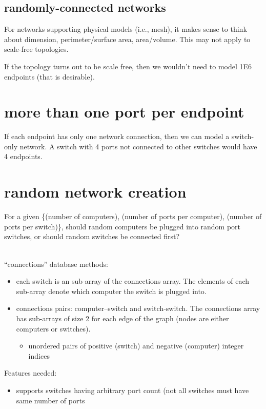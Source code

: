 \documentclass[pdftex]{article}
\begin{document}
\subsection{randomly-connected networks}

For networks supporting physical models (i.e., mesh), it makes sense to think about dimension, perimeter/surface area, area/volume. This may not apply to scale-free topologies. 

If the topology turns out to be scale free, then we wouldn't need to model 1E6 endpoints (that is desirable).

\section{more than one port per endpoint}

If each endpoint has only one network connection, then we can model a switch-only network. A switch with 4 ports not connected to other switches would have 4 endpoints.

\section{random network creation}

For a given \{(number of computers), (number of ports per computer), (number of ports per switch)\}, should random computers be plugged into random port switches, or should random switches be connected first?

\ \\
``connections'' database methods:
\begin{itemize}
 \item each switch is an sub-array of the connections array. The elements of each sub-array denote which computer the switch is plugged into. 
 \item connections pairs: computer--switch and switch-switch. The connections array has sub-arrays of size 2 for each edge of the graph (nodes are either computers or switches).
 \begin{itemize}
  \item unordered pairs of positive (switch) and negative (computer) integer indices
 \end{itemize}

\end{itemize}
Features needed:
 \begin{itemize}
  \item supports switches having arbitrary port count (not all switches must have same number of ports
 \end{itemize}
\end{document}
